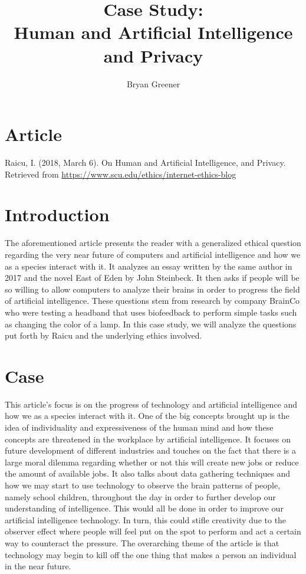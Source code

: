 \documentclass[notitlepage,a4paper,12pt]{article}
\author{Bryan Greener}
\title{Case Study:\\Human and Artificial Intelligence and Privacy}
\begin{document}
\maketitle

\section*{Article}
Raicu, I. (2018, March 6). On Human and Artificial Intelligence, and Privacy.\\Retrieved from \url{https://www.scu.edu/ethics/internet-ethics-blog}

\section*{Introduction}
The aforementioned article presents the reader with a generalized ethical question regarding the very near future of computers and artificial intelligence and how we as a species interact with it. It analyzes an essay written by the same author in 2017 and the novel East of Eden by John Steinbeck. It then asks if people will be so willing to allow computers to analyze their brains in order to progress the field of artificial intelligence. These questions stem from research by company BrainCo who were testing a headband that uses biofeedback to perform simple tasks such as changing the color of a lamp. In this case study, we will analyze the questions put forth by Raicu and the underlying ethics involved.

\section*{Case}
This article's focus is on the progress of technology and artificial intelligence and how we as a species interact with it. One of the big concepts brought up is the idea of individuality and expressiveness of the human mind and how these concepts are threatened in the workplace by artificial intelligence. It focuses on future development of different industries and touches on the fact that there is a large moral dilemma regarding whether or not this will create new jobs or reduce the amount of available jobs. It also talks about data gathering techniques and how we may start to use technology to observe the brain patterns of people, namely school children, throughout the day in order to further develop our understanding of intelligence. This would all be done in order to improve our artificial intelligence technology. In turn, this could stifle creativity due to the observer effect where people will feel put on the spot to perform and act a certain way to counteract the pressure. The overarching theme of the article is that technology may begin to kill off the one thing that makes a person an individual in the near future.
\end{document}
